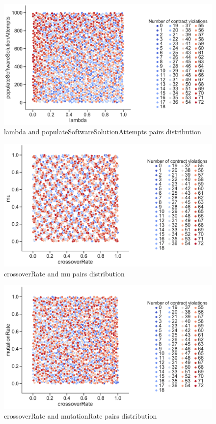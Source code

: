 \begin{figure}
	\centering
	\includegraphics[width=\textwidth]{images/PairsDistr/lambda_populateSoftwareSolutionAttempts.pdf}
	\caption[lambda and populateSoftwareSolutionAttempts pairs distribution]{lambda and populateSoftwareSolutionAttempts pairs distribution}
	\label{fig:lambda_populateSoftwareSolutionAttempts_pair}
\end{figure}
\begin{figure}
	\centering
	\includegraphics[width=\textwidth]{images/PairsDistr/crossoverRate_mu.pdf}
	\caption[crossoverRate and mu pairs distribution]{crossoverRate and mu pairs distribution}
	\label{fig:crossoverRate_mu_pair}
\end{figure}
\begin{figure}
	\centering
	\includegraphics[width=\textwidth]{images/PairsDistr/crossoverRate_mutationRate.pdf}
	\caption[crossoverRate and mutationRate pairs distribution]{crossoverRate and mutationRate pairs distribution}
	\label{fig:crossoverRate_mutationRate_pair}
\end{figure}
